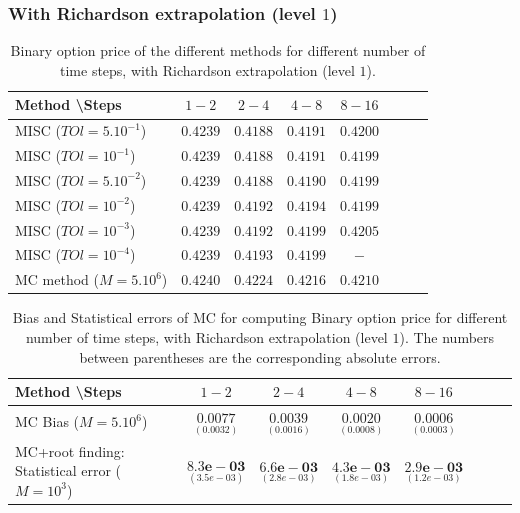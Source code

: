 \documentclass[11pt]{article}
\begin{document}
\FloatBarrier

\subsubsection*{With Richardson extrapolation (level $1$)}

\begin{table}[h!]
	\centering
	\begin{tabular}{l*{6}{c}r}
		Method \textbackslash  Steps            & $1-2$ & $2-4$ & $4-8$ & $8-16$ &   \\
		\hline
		MISC ($TOl=5.10^{-1}$)  & $0.4239$ & $0.4188$ & $0.4191$ & $0.4200$  \\
		MISC ($TOl=10^{-1}$)  &$0.4239$ & $0.4188$ &$0.4191$ & $0.4199$  \\
		MISC ($TOl=5.10^{-2}$) & $0.4239$ & $0.4188$ & $0.4190$ & $0.4199$  \\
		MISC ($TOl=10^{-2}$) &$0.4239$ & $0.4192$ & $0.4194$ & $0.4199$  \\
		MISC ($TOl=10^{-3}$) & $0.4239$ & $0.4192$ & $0.4199$ & $0.4205$  \\
			MISC ($TOl=10^{-4}$) & $0.4239$ & $0.4193$ & $0.4199$ & $-$  \\
		\hline
		MC method ($M=5.10^{6}$)   & $ 0.4240$ & $
		0.4224$ & $    0.4216$ & $  0.4210$  \\
		\hline
	\end{tabular}
	\caption{Binary option price of the different methods for different number of time steps, with Richardson extrapolation (level $1$).}
	\label{table: Binary option price of the different methods for different number of time steps, with Richardson extrapolation (level1).}
\end{table}


\begin{table}[h!]
	\centering
	\begin{tabular}{l*{6}{c}r}
		Method \textbackslash  Steps            & $1-2$ & $2-4$ & $4-8$ & $8-16$  \\
		\hline
	MC Bias  ($M=5.10^{6}$)&$ \underset{(0.0032)}{\mathbf{0.0077}}$    & $\underset{(    0.0016
		)}{\mathbf{0.0039}}$  & $\underset{(0.0008)}{\mathbf{0.0020}}$  & $\underset{(0.0003)}{\mathbf{0.0006}}$\\
		
		MC+root finding: Statistical error ($M=10^3$)     & 	$ \underset{( 3.5e-03  )}{\mathbf{8.3e-03}}$  & $\underset{(2.8e-03)}{\mathbf{ 6.6e-03
		}}$  & $\underset{(1.8e-03)}{\mathbf{4.3e-03}}$ & $\underset{(  1.2e-03 )}{\mathbf{  2.9e-03 }}$\\ 
		
		\hline
	\end{tabular}
	\caption{Bias and Statistical errors of MC  for computing Binary option price  for different number of time steps, with Richardson extrapolation (level $1$). The numbers between parentheses are the corresponding absolute errors.}
	\label{Bias and Statistical errors of MC  for computing Binary option price  for different number of time steps, with Richardson extrapolation (level $1$). The numbers between parentheses are the corresponding absolute errors.}
\end{table}
\end{document}
